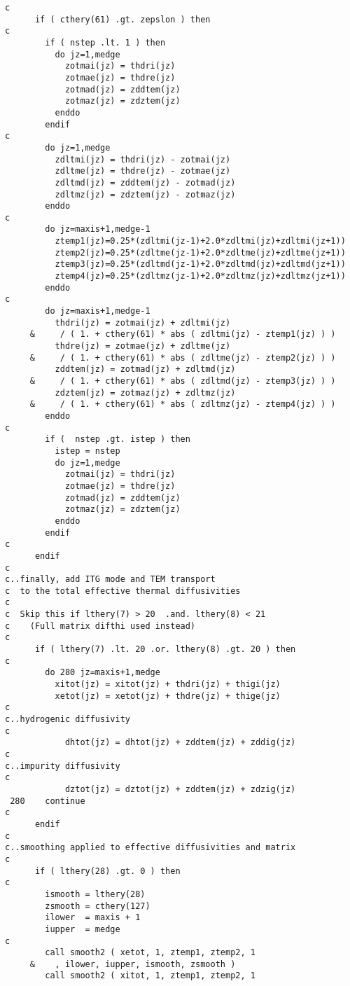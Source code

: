 \begin{verbatim}
c
      if ( cthery(61) .gt. zepslon ) then
c
        if ( nstep .lt. 1 ) then
          do jz=1,medge
            zotmai(jz) = thdri(jz)
            zotmae(jz) = thdre(jz)
            zotmad(jz) = zddtem(jz)
            zotmaz(jz) = zdztem(jz)
          enddo
        endif
c
        do jz=1,medge
          zdltmi(jz) = thdri(jz) - zotmai(jz)
          zdltme(jz) = thdre(jz) - zotmae(jz)
          zdltmd(jz) = zddtem(jz) - zotmad(jz)
          zdltmz(jz) = zdztem(jz) - zotmaz(jz)
        enddo
c
        do jz=maxis+1,medge-1
          ztemp1(jz)=0.25*(zdltmi(jz-1)+2.0*zdltmi(jz)+zdltmi(jz+1))
          ztemp2(jz)=0.25*(zdltme(jz-1)+2.0*zdltme(jz)+zdltme(jz+1))
          ztemp3(jz)=0.25*(zdltmd(jz-1)+2.0*zdltmd(jz)+zdltmd(jz+1))
          ztemp4(jz)=0.25*(zdltmz(jz-1)+2.0*zdltmz(jz)+zdltmz(jz+1))
        enddo
c
        do jz=maxis+1,medge-1
          thdri(jz) = zotmai(jz) + zdltmi(jz)
     &     / ( 1. + cthery(61) * abs ( zdltmi(jz) - ztemp1(jz) ) )
          thdre(jz) = zotmae(jz) + zdltme(jz)
     &     / ( 1. + cthery(61) * abs ( zdltme(jz) - ztemp2(jz) ) )
          zddtem(jz) = zotmad(jz) + zdltmd(jz)
     &     / ( 1. + cthery(61) * abs ( zdltmd(jz) - ztemp3(jz) ) )
          zdztem(jz) = zotmaz(jz) + zdltmz(jz)
     &     / ( 1. + cthery(61) * abs ( zdltmz(jz) - ztemp4(jz) ) )
        enddo
c
        if (  nstep .gt. istep ) then
          istep = nstep
          do jz=1,medge
            zotmai(jz) = thdri(jz)
            zotmae(jz) = thdre(jz)
            zotmad(jz) = zddtem(jz)
            zotmaz(jz) = zdztem(jz)
          enddo
        endif
c
      endif
c
c..finally, add ITG mode and TEM transport
c  to the total effective thermal diffusivities
c
c  Skip this if lthery(7) > 20  .and. lthery(8) < 21
c    (Full matrix difthi used instead)
c
      if ( lthery(7) .lt. 20 .or. lthery(8) .gt. 20 ) then
c
        do 280 jz=maxis+1,medge
          xitot(jz) = xitot(jz) + thdri(jz) + thigi(jz)
          xetot(jz) = xetot(jz) + thdre(jz) + thige(jz)
c
c..hydrogenic diffusivity
c
            dhtot(jz) = dhtot(jz) + zddtem(jz) + zddig(jz)
c
c..impurity diffusivity
c
            dztot(jz) = dztot(jz) + zddtem(jz) + zdzig(jz)
 280    continue
c
      endif
c
c..smoothing applied to effective diffusivities and matrix
c
      if ( lthery(28) .gt. 0 ) then
c
        ismooth = lthery(28)
        zsmooth = cthery(127)
        ilower  = maxis + 1
        iupper  = medge
c
        call smooth2 ( xetot, 1, ztemp1, ztemp2, 1
     &    , ilower, iupper, ismooth, zsmooth )
        call smooth2 ( xitot, 1, ztemp1, ztemp2, 1

\end{verbatim}
